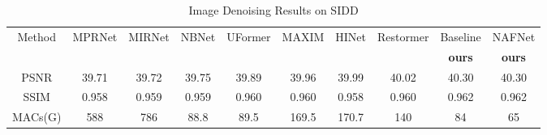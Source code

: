 \documentclass[runningheads]{llncs}
\begin{document}
 \begin{table}
\scriptsize
\begin{center}
\caption{Image Denoising Results on SIDD\cite{SIDD_2018_CVPR}}
\label{tab:SOTAs-on-SIDD}
\begin{tabular}{c|ccccccc|cc}
\hline
\multirow{2}{*}{Method} & MPRNet & MIRNet & NBNet & UFormer &  MAXIM & HINet &Restormer & Baseline & NAFNet \\
& \cite{waqas2021multi} & \cite{zamir2020learning} & \cite{cheng2021nbnet} & \cite{wang2021uformer} & \cite{tu2022maxim} & \cite{chen2021hinet} & \cite{zamir2021restormer} & \textbf{ours} & \textbf{ours} \\
\hline
PSNR & 39.71 & 39.72 & 39.75 & 39.89 & 39.96 & 39.99 & 40.02 & 40.30 & 40.30 \\
SSIM & 0.958 & 0.959 & 0.959 & 0.960 & 0.960 & 0.958 & 0.960 & 0.962 & 0.962 \\
\hline
MACs(G) & 588 & 786 & 88.8 & 89.5& 169.5& 170.7& 140&84& 65 \\
\hline
\end{tabular}
\end{center}
\end{table}
\vspace{-0.5cm}
\end{document}
